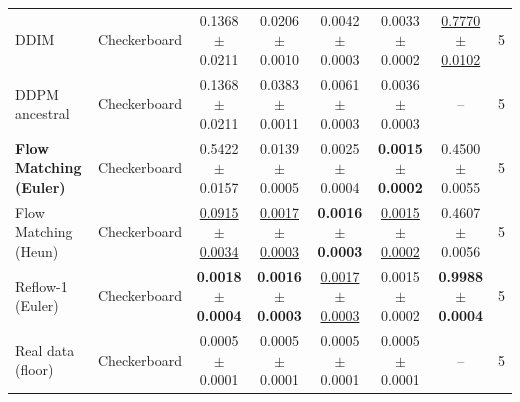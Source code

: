 \begin{tabular}{llcccccc}
\midrule
DDIM & Checkerboard & 0.1368 $\pm$ 0.0211 & 0.0206 $\pm$ 0.0010 & 0.0042 $\pm$ 0.0003 & 0.0033 $\pm$ 0.0002 & \underline{0.7770 $\pm$ 0.0102} & 5 \\
DDPM ancestral & Checkerboard & 0.1368 $\pm$ 0.0211 & 0.0383 $\pm$ 0.0011 & 0.0061 $\pm$ 0.0003 & 0.0036 $\pm$ 0.0003 & -- & 5 \\
\textbf{Flow Matching (Euler)} & Checkerboard & 0.5422 $\pm$ 0.0157 & 0.0139 $\pm$ 0.0005 & 0.0025 $\pm$ 0.0004 & \textbf{0.0015 $\pm$ 0.0002} & 0.4500 $\pm$ 0.0055 & 5 \\
Flow Matching (Heun) & Checkerboard & \underline{0.0915 $\pm$ 0.0034} & \underline{0.0017 $\pm$ 0.0003} & \textbf{0.0016 $\pm$ 0.0003} & \underline{0.0015 $\pm$ 0.0002} & 0.4607 $\pm$ 0.0056 & 5 \\
Reflow-1 (Euler) & Checkerboard & \textbf{0.0018 $\pm$ 0.0004} & \textbf{0.0016 $\pm$ 0.0003} & \underline{0.0017 $\pm$ 0.0003} & 0.0015 $\pm$ 0.0002 & \textbf{0.9988 $\pm$ 0.0004} & 5 \\
Real data (floor) & Checkerboard & 0.0005 $\pm$ 0.0001 & 0.0005 $\pm$ 0.0001 & 0.0005 $\pm$ 0.0001 & 0.0005 $\pm$ 0.0001 & -- & 5 \\
\bottomrule
\end{tabular}
